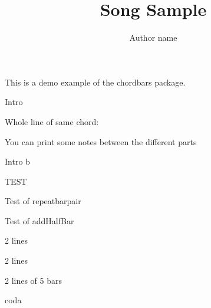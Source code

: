 \documentclass[11pt]{article}
\title{Song Sample}
\author{Author name}
\begin{document}
\bpbthree

\countbarsYes

\songtitle

This is a demo example of the chordbars package.


\begin{chordbar}{4}{Intro}
\end{chordbar}


Whole line of same chord:


You can print some notes between the different parts

\def\barsize{1.8}%

\begin{chordbar}[3]{6}{Intro b}
\repeatBar
{}
\end{chordbar}


\def\barsize{1.4}%
\begin{chordbar}[2]{4}{TEST}
\repeatBar
\end{chordbar}

\begin{chordbar}{5}{Test of repeatbarpair}
\repeatBarPair
{}
\end{chordbar}

\begin{chordbar}{4}{Test of addHalfBar}
\repeatBar
{}
\end{chordbar}


\begin{chordbar}[2]{6}{2 lines}
\repeatBar
{}
\repeatBar
\end{chordbar}

\begin{chordbar}[4]{11}{2 lines}
\newchordline
{}
\repeatBar
\end{chordbar}

\begin{chordbar}[2]{10}{2 lines of 5 bars}
\newchordline
{}
\repeatBar
\end{chordbar}

\xdef\NumberOfBarsPerLine{8}
\begin{chordbar}[2]{6}{coda}
\end{chordbar}


\printNbBars
\end{document}

